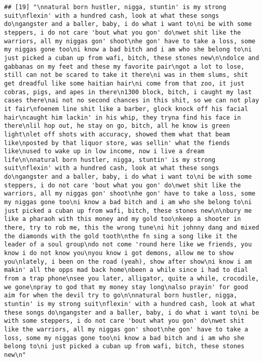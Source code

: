 \documentclass[]{article}
\begin{document}
\begin{verbatim}
## [19] "\nnatural born hustler, nigga, stuntin' is my strong suit\nflexin' with a hundred cash, look at what these songs do\ngangster and a baller, baby, i do what i want to\ni be with some steppers, i do not care 'bout what you gon' do\nwet shit like the warriors, all my niggas gon' shoot\nhe gon' have to take a loss, some my niggas gone too\ni know a bad bitch and i am who she belong to\ni just picked a cuban up from wafi, bitch, these stones new\n\ndolce and gabbanas on my feet and these my favorite pair\ngot a lot to lose, still can not be scared to take it there\ni was in them slums, shit get dreadful like some haitian hair\ni come from that zoo, it just cobras, pigs, and apes in there\n1300 block, bitch, i caught my last cases there\nai not no second chances in this shit, so we can not play it fair\nfoenem line shit like a barber, glock knock off his facial hair\ncaught him lackin' in his whip, they tryna find his face in there\nlil hop out, he stay on go, bitch, all he know is green light\nlet off shots with accuracy, showed them what that beam like\nposted by that liquor store, was sellin' what the fiends like\nused to wake up in low income, now i live a dream life\n\nnatural born hustler, nigga, stuntin' is my strong suit\nflexin' with a hundred cash, look at what these songs do\ngangster and a baller, baby, i do what i want to\ni be with some steppers, i do not care 'bout what you gon' do\nwet shit like the warriors, all my niggas gon' shoot\nhe gon' have to take a loss, some my niggas gone too\ni know a bad bitch and i am who she belong to\ni just picked a cuban up from wafi, bitch, these stones new\n\nbury me like a pharaoh with this money and my gold too\nkeep a shooter in there, try to rob me, this the wrong tune\ni hit johnny dang and mixed the diamonds with the gold tooth\nthe fn sing a song like it the leader of a soul group\ndo not come 'round here like we friends, you know i do not know you\nyou know i got demons, allow me to show you\nlately, i been on the road (yeah), show after show\ni know i am makin' all the opps mad back home\nbeen a while since i had to dial from a trap phone\nsee you later, alligator, quite a while, crocodile, we gone\npray to god that my money stay long\nalso prayin' for good aim for when the devil try to go\n\nnatural born hustler, nigga, stuntin' is my strong suit\nflexin' with a hundred cash, look at what these songs do\ngangster and a baller, baby, i do what i want to\ni be with some steppers, i do not care 'bout what you gon' do\nwet shit like the warriors, all my niggas gon' shoot\nhe gon' have to take a loss, some my niggas gone too\ni know a bad bitch and i am who she belong to\ni just picked a cuban up from wafi, bitch, these stones new\n"                                                                                                                                                                                                                                                                                                                                                                                                                                                                                                                                                                                                 
\end{verbatim}
\end{document}

